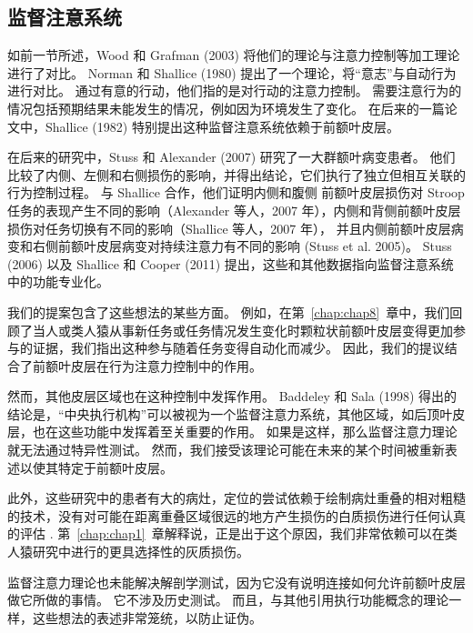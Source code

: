 \subsection{监督注意系统}
如前一节所述，Wood 和 Grafman (2003) 将他们的理论与注意力控制等加工理论进行了对比。 Norman 和 Shallice (1980) 提出了一个理论，将“意志”与自动行为进行对比。 通过有意的行动，他们指的是对行动的注意力控制。 需要注意行为的情况包括预期结果未能发生的情况，例如因为环境发生了变化。 在后来的一篇论文中，Shallice (1982) 特别提出这种监督注意系统依赖于前额叶皮层。
\par 
在后来的研究中，Stuss 和 Alexander (2007) 研究了一大群额叶病变患者。 他们比较了内侧、左侧和右侧损伤的影响，并得出结论，它们执行了独立但相互关联的行为控制过程。 与 Shallice 合作，他们证明内侧和腹侧 前额叶皮层损伤对 Stroop 任务的表现产生不同的影响（Alexander 等人，2007 年），内侧和背侧前额叶皮层损伤对任务切换有不同的影响（Shallice 等人，2007 年）， 并且内侧前额叶皮层病变和右侧前额叶皮层病变对持续注意力有不同的影响 (Stuss et al. 2005)。 Stuss (2006) 以及 Shallice 和 Cooper (2011) 提出，这些和其他数据指向监督注意系统中的功能专业化。
\par 
我们的提案包含了这些想法的某些方面。 例如，在第~\ref{chap:chap8}~章中，我们回顾了当人或类人猿从事新任务或任务情况发生变化时颗粒状前额叶皮层变得更加参与的证据，我们指出这种参与随着任务变得自动化而减少。 因此，我们的提议结合了前额叶皮层在行为注意力控制中的作用。
\par 
然而，其他皮层区域也在这种控制中发挥作用。 Baddeley 和 Sala (1998) 得出的结论是，“中央执行机构”可以被视为一个监督注意力系统，其他区域，如后顶叶皮层，也在这些功能中发挥着至关重要的作用。 如果是这样，那么监督注意力理论就无法通过特异性测试。 然而，我们接受该理论可能在未来的某个时间被重新表述以使其特定于前额叶皮层。
\par 
此外，这些研究中的患者有大的病灶，定位的尝试依赖于绘制病灶重叠的相对粗糙的技术，没有对可能在距离重叠区域很远的地方产生损伤的白质损伤进行任何认真的评估 . 第~\ref{chap:chap1}~章解释说，正是出于这个原因，我们非常依赖可以在类人猿研究中进行的更具选择性的灰质损伤。
\par 
监督注意力理论也未能解决解剖学测试，因为它没有说明连接如何允许前额叶皮层做它所做的事情。 它不涉及历史测试。 而且，与其他引用执行功能概念的理论一样，这些想法的表述非常笼统，以防止证伪。
